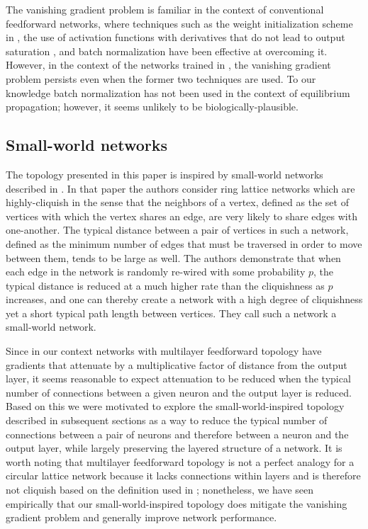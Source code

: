 \documentclass[utf8]{frontiersSCNS}
\begin{document}
The vanishing gradient problem is familiar in the context of conventional feedforward networks, where techniques such as the weight initialization scheme in \citep{glorot2010}, the use of activation functions with derivatives that do not lead to output saturation \citep{schmidhuber2015}, and batch normalization \citep{ioffe2015} have been effective at overcoming it. However, in the context of the networks trained in \citep{scellier17}, the vanishing gradient problem persists even when the former two techniques are used. To our knowledge batch normalization has not been used in the context of equilibrium propagation; however, it seems unlikely to be biologically-plausible.

\subsection{Small-world networks}

The topology presented in this paper is inspired by small-world networks described in \citep{watts98}. In that paper the authors consider ring lattice networks which are highly-cliquish in the sense that the neighbors of a vertex, defined as the set of vertices with which the vertex shares an edge, are very likely to share edges with one-another. The typical distance between a pair of vertices in such a network, defined as the minimum number of edges that must be traversed in order to move between them, tends to be large as well. The authors demonstrate that when each edge in the network is randomly re-wired with some probability $p$, the typical distance is reduced at a much higher rate than the cliquishness as $p$ increases, and one can thereby create a network with a high degree of cliquishness yet a short typical path length between vertices. They call such a network a small-world network.

Since in our context networks with multilayer feedforward topology have gradients that attenuate by a multiplicative factor of distance from the output layer, it seems reasonable to expect attenuation to be reduced when the typical number of connections between a given neuron and the output layer is reduced. Based on this we were motivated to explore the small-world-inspired topology described in subsequent sections as a way to reduce the typical number of connections between a pair of neurons and therefore between a neuron and the output layer, while largely preserving the layered structure of a network. It is worth noting that multilayer feedforward topology is not a perfect analogy for a circular lattice network because it lacks connections within layers and is therefore not cliquish based on the definition used in \citep{watts98}; nonetheless, we have seen empirically that our small-world-inspired topology does mitigate the vanishing gradient problem and generally improve network performance.
\end{document}
